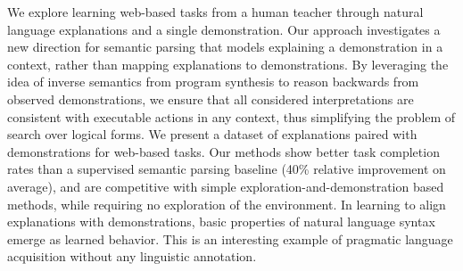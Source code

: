 We explore learning web-based tasks from a human teacher through natural language explanations and a single demonstration. Our approach investigates a new direction for semantic parsing that models explaining a demonstration in a context, rather than mapping explanations to demonstrations. By leveraging the idea of inverse semantics from program synthesis to reason backwards from observed demonstrations, we ensure that all considered interpretations are consistent with executable actions in any context, thus simplifying the problem of search over logical forms. We present a dataset of explanations paired with demonstrations for web-based tasks. Our methods show better task completion rates than a supervised semantic parsing baseline (40\% relative improvement on average), and are competitive with simple exploration-and-demonstration based methods, while requiring no exploration of the environment. In learning to align explanations with demonstrations, basic properties of natural language syntax emerge as learned behavior. This is an interesting example of pragmatic language acquisition without any linguistic annotation.
